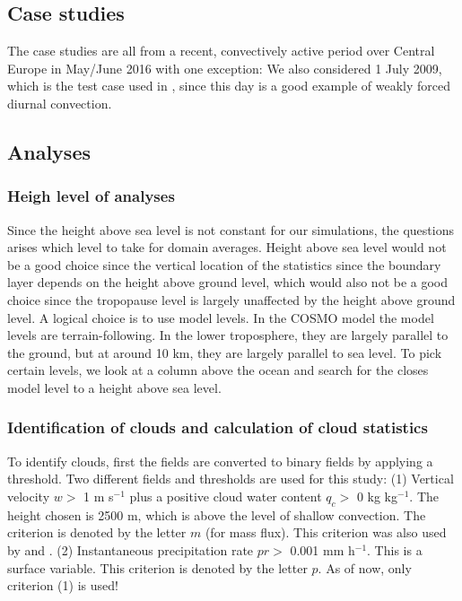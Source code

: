 \documentclass[a4paper, 12pt, draft]{article}
\begin{document}
\subsection{Case studies}
The case studies are all from a recent, convectively active period over Central Europe in May/June 2016 with one exception: We also considered 1 July 2009, which is the test case used in \cite{Kober2016}, since this day is a good example of weakly forced diurnal convection.  

\subsection{Analyses}

\subsubsection{Heigh level of analyses}
Since the height above sea level is not constant for our simulations, the questions arises which level to take for domain averages. Height above sea level would not be a good choice since the vertical location of the statistics since the boundary layer depends on the height above ground level, which would also not be a good choice since the tropopause level is largely unaffected by the height above ground level. A logical choice is to use model levels. In the COSMO model the model levels are terrain-following. In the lower troposphere, they are largely parallel to the ground, but at around 10 km, they are largely parallel to sea level. To pick certain levels, we look at a column above the ocean and search for the closes model level to a height above sea level. 

\subsubsection{Identification of clouds and calculation of cloud statistics}
To identify clouds, first the fields are converted to binary fields by applying a threshold. Two different fields and thresholds are used for this study: (1) Vertical velocity $w >$ 1 m s$^{-1}$ plus a positive cloud water content $q_c >$ 0 kg kg$^{-1}$. The height chosen is 2500 m, which is above the level of shallow convection. The criterion is denoted by the letter $m$ (for mass flux). This criterion was also used by \cite{Cohen2006} and \cite{Davoudi2010}. (2) Instantaneous precipitation rate $pr >$ 0.001 mm h$^{-1}$. This is a surface variable. This criterion is denoted by the letter $p$. As of now, only criterion (1) is used!
\end{document}
